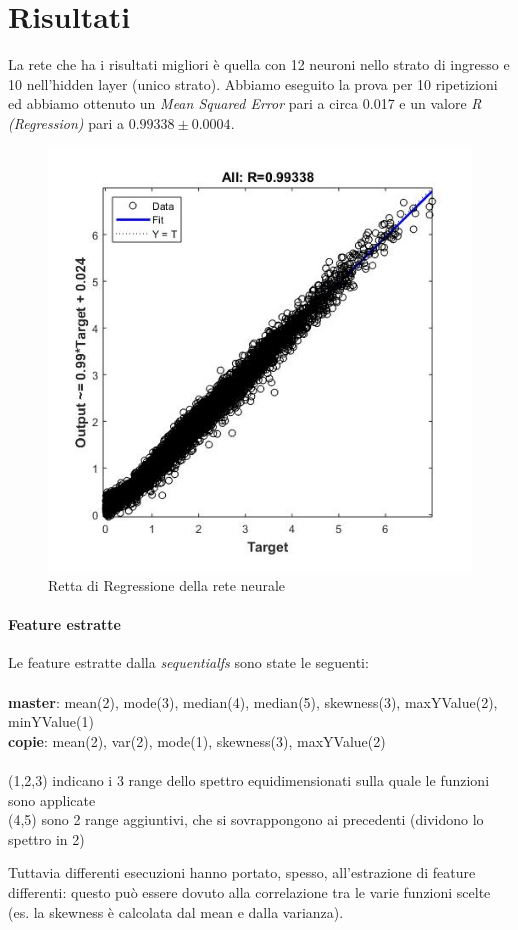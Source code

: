 \section{Risultati}
La rete che ha i risultati migliori è quella con 12 neuroni nello strato di ingresso e 10 nell'hidden layer (unico strato). Abbiamo eseguito la prova per 10 ripetizioni ed abbiamo ottenuto un \textit{Mean Squared Error} pari a circa 0.017 e un valore \textit{R (Regression)} pari a \(0.99338 \pm 0.0004\).

\begin{figure}[!ht]
\begin{center}
	\includegraphics[scale=0.7]{images/rete1-regression.jpg}
\end{center}
\caption{Retta di Regressione della rete neurale}
\end{figure}

\paragraph{Feature estratte}
Le feature estratte dalla \textit{sequentialfs} sono state le seguenti:
\\\\
\textbf{master}: mean(2), mode(3), median(4), median(5), skewness(3), maxYValue(2), minYValue(1)
\\
\textbf{copie}: mean(2), var(2), mode(1), skewness(3), maxYValue(2)
\\\\(1,2,3) indicano i 3 range dello spettro equidimensionati sulla quale le funzioni sono applicate
\\(4,5) sono 2 range aggiuntivi, che si sovrappongono ai precedenti (dividono lo spettro in 2)

Tuttavia differenti esecuzioni hanno portato, spesso, all'estrazione di feature differenti: questo può essere dovuto alla correlazione tra le varie funzioni scelte (es. la skewness è calcolata dal mean e dalla varianza).
